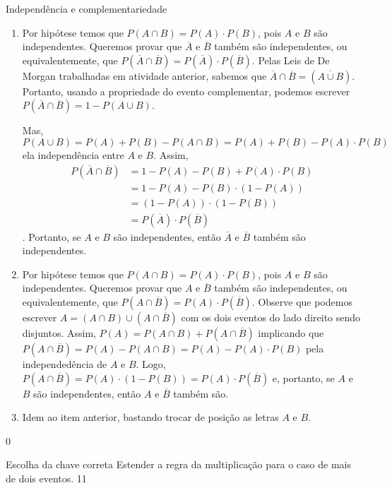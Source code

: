 \begin{answer}{Independência e complementariedade}
{
\begin{enumerate}
\item Por hipótese temos que $P(A\cap B)=P(A)\cdot P(B)$, pois $A$ e $B$ são independentes. Queremos provar que $\overline{A}$ e $\overline{B}$ também são independentes, ou equivalentemente, que $P(\overline{A}\cap \overline{B})=P(\overline{A})\cdot P(\overline{B})$.
Pelas Leis de De Morgan trabalhadas em atividade anterior, sabemos que $\overline{A}\cap \overline{B}=(\overline{A\cup B})$. Portanto, usando a propriedade do evento complementar, podemos escrever $P(\overline{A}\cap \overline{B})=1−P(A\cup B)$.

Mas, 
\begin{equation*}
P(A\cup B)=P(A)+P(B)-P(A\cap B)=P(A)+P(B)-P(A)\cdot P(B)
\end{equation*}
ela independência entre $A$ e $B$. Assim,
\begin{align*}
P(\overline{A}\cap \overline{B})&=1-P(A)-P(B)+P(A)\cdot P(B)\\ 
&=1-P(A)-P(B)\cdot(1−P(A))\\
&=(1−P(A))\cdot(1-P(B))\\
&=P(\overline{A})\cdot P(\overline{B})
\end{align*}.
Portanto, se $A$ e $B$ são independentes, então $\overline{A}$ e $\overline{B}$ também são independentes.

\item Por hipótese temos que $P(A\cap B)=P(A)\cdot P(B)$, pois $A$ e $B$ são independentes. Queremos provar que $A$ e $\overline{B}$ também são independentes, ou equivalentemente, que $P(A\cap \overline{B})=P(A)\cdot P(\overline{B})$. Observe que podemos escrever $A=(A\cap B)\cup (A\cap\overline{B})$ com os dois eventos do lado direito sendo disjuntos. Assim, $P(A)=P(A\cap B)+P(A\cap \overline{B})$ implicando que $P(A\cap \overline{B})=P(A)-P(A\cap B)=P(A)-P(A)\cdot P(B)$ pela independedência de $A$ e $B$. Logo, $P(A\cap \overline{B})=P(A)\cdot(1−P(B))=P(A)\cdot P(\overline{B})$ e, portanto, se $A$ e $B$ são independentes, então $A$ e $\overline{B}$ também são.
\item Idem ao item anterior, bastando trocar de posição as letras $A$ e $B$.
\end{enumerate}
}{0}
\end{answer}
\begin{objectives}{Escolha da chave correta}
{
Estender a regra da multiplicação para o caso de mais de dois eventos.
}{1}{1}
\end{objectives}
